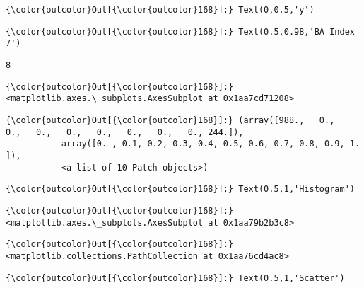 \documentclass[11pt]{article}
\begin{document}
\begin{Verbatim}[commandchars=\\\{\}]
{\color{outcolor}Out[{\color{outcolor}168}]:} Text(0,0.5,'y')
\end{Verbatim}
            
\begin{Verbatim}[commandchars=\\\{\}]
{\color{outcolor}Out[{\color{outcolor}168}]:} Text(0.5,0.98,'BA Index 7')
\end{Verbatim}
            
    \begin{Verbatim}[commandchars=\\\{\}]
8

    \end{Verbatim}

\begin{Verbatim}[commandchars=\\\{\}]
{\color{outcolor}Out[{\color{outcolor}168}]:} <matplotlib.axes.\_subplots.AxesSubplot at 0x1aa7cd71208>
\end{Verbatim}
            
\begin{Verbatim}[commandchars=\\\{\}]
{\color{outcolor}Out[{\color{outcolor}168}]:} (array([988.,   0.,   0.,   0.,   0.,   0.,   0.,   0.,   0., 244.]),
           array([0. , 0.1, 0.2, 0.3, 0.4, 0.5, 0.6, 0.7, 0.8, 0.9, 1. ]),
           <a list of 10 Patch objects>)
\end{Verbatim}
            
\begin{Verbatim}[commandchars=\\\{\}]
{\color{outcolor}Out[{\color{outcolor}168}]:} Text(0.5,1,'Histogram')
\end{Verbatim}
            
\begin{Verbatim}[commandchars=\\\{\}]
{\color{outcolor}Out[{\color{outcolor}168}]:} <matplotlib.axes.\_subplots.AxesSubplot at 0x1aa79b2b3c8>
\end{Verbatim}
            
\begin{Verbatim}[commandchars=\\\{\}]
{\color{outcolor}Out[{\color{outcolor}168}]:} <matplotlib.collections.PathCollection at 0x1aa76cd4ac8>
\end{Verbatim}
            
\begin{Verbatim}[commandchars=\\\{\}]
{\color{outcolor}Out[{\color{outcolor}168}]:} Text(0.5,1,'Scatter')
\end{Verbatim}
            
\end{document}
